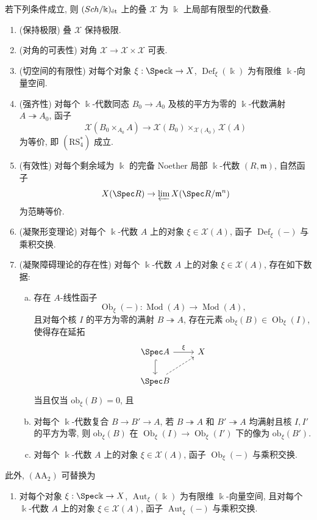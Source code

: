 \begin{theorem}\label{src:C.7.4}
若下列条件成立, 则 $(Sch/\Bbbk)_{\text{ét}}$ 上的叠 $\mathcal X$ 为 $\Bbbk$ 上局部有限型的代数叠.
\begin{enumerate}[$(\mathrm{AA}_1)$]
\item (保持极限) 叠 $\mathcal X$ 保持极限.
\item (对角的可表性) 对角 $\mathcal X\to\mathcal X\times\mathcal X$ 可表.
\item (切空间的有限性) 对每个对象 $\xi:\Spec\Bbbk\to\mathcal X$, $\operatorname{Def}_{\xi}(\Bbbk)$ 为有限维 $\Bbbk$-向量空间.
\item (强齐性) 对每个 $\Bbbk$-代数同态 $B_0\to A_0$ 及核的平方为零的 $\Bbbk$-代数满射 $A\twoheadrightarrow A_0$, 函子
\[
\mathcal X(B_0\times_{A_0}A)\to\mathcal X(B_0)\times_{\mathcal X(A_0)}\mathcal X(A)
\]
为等价, 即 $(\mathrm{RS}_4^*)$ 成立.
\item (有效性) 对每个剩余域为 $\Bbbk$ 的完备 Noether 局部 $\Bbbk$-代数 $(R,\mathfrak m)$, 自然函子
\[
\mathcal X(\Spec R)\to\varprojlim\mathcal X(\Spec R/\mathfrak m^n)
\]
为范畴等价.
\item (凝聚形变理论) 对每个 $\Bbbk$-代数 $A$ 上的对象 $\xi\in\mathcal X(A)$, 函子 $\operatorname{Def}_{\xi}(-)$ 与乘积交换.
\item (凝聚障碍理论的存在性) 对每个 $\Bbbk$-代数 $A$ 上的对象 $\xi\in\mathcal X(A)$, 存在如下数据:
\begin{enumerate}[(a)]
\item 存在 $A$-线性函子
\[
\operatorname{Ob}_{\xi}(-):\operatorname{Mod}(A)\to\operatorname{Mod}(A),
\]
且对每个核 $I$ 的平方为零的满射 $B\twoheadrightarrow A$, 存在元素 $\mathrm{ob}_{\xi}(B)\in\operatorname{Ob}_{\xi}(I)$, 使得存在延拓
\[
\begin{tikzcd}
\Spec A\arrow[r,"\xi"]\arrow[d,hook]&\mathcal X\\
\Spec B\arrow[ur,dashed]&
\end{tikzcd}
\]
当且仅当 $\mathrm{ob}_{\xi}(B)=0$, 且
\item 对每个 $\Bbbk$-代数复合 $B\to B'\to A$, 若 $B\twoheadrightarrow A$ 和 $B'\twoheadrightarrow A$ 均满射且核 $I,I'$ 的平方为零, 则 $\mathrm{ob}_{\xi}(B)$ 在 $\operatorname{Ob}_{\xi}(I)\to\operatorname{Ob}_{\xi}(I')$ 下的像为 $\mathrm{ob}_{\xi}(B')$.
\item 对每个 $\Bbbk$-代数 $A$ 上的对象 $\xi\in\mathcal X(A)$, 函子 $\operatorname{Ob}_{\xi}(-)$ 与乘积交换.
\end{enumerate}
\end{enumerate}
此外, $(\mathrm{AA}_2)$ 可替换为
\begin{enumerate}[(1)]
\item[$(\mathrm{AA}_{2'})$] 对每个对象 $\xi:\Spec\Bbbk\to\mathcal X$, $\operatorname{Aut}_{\xi}(\Bbbk)$ 为有限维 $\Bbbk$-向量空间, 且对每个 $\Bbbk$-代数 $A$ 上的对象 $\xi\in\mathcal X(A)$, 函子 $\operatorname{Aut}_{\xi}(-)$ 与乘积交换.
\end{enumerate}
\end{theorem}

